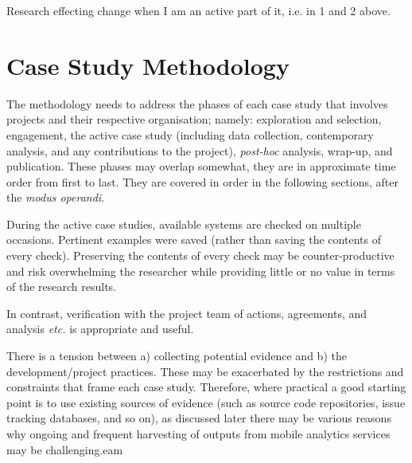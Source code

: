 Research effecting change when I am an active part of it, i.e. in 1 and 2 above.

\section{Case Study Methodology}
The methodology needs to address the phases of each case study that involves projects and their respective organisation; namely: exploration and selection, engagement, the active case study (including data collection, contemporary analysis, and any contributions to the project), \emph{post-hoc} analysis, wrap-up, and publication. These phases may overlap somewhat, they are in approximate time order from first to last. They are covered in order in the following sections, after the \emph{modus operandi}.

During the active case studies, available systems are checked on multiple occasions. Pertinent examples were saved (rather than saving the contents of every check). Preserving the contents of every check may be counter-productive and risk overwhelming the researcher while providing little or no value in terms of the research results. 

In contrast, verification with the project team of actions, agreements, and analysis \emph{etc.} is appropriate and useful.

There is a tension between a) collecting potential evidence and b) the development/project practices. These may be exacerbated by the restrictions and constraints that frame each case study. Therefore, where practical a good starting point is to use existing sources of evidence (such as source code repositories, issue tracking databases, and so on), as discussed later there may be various reasons why ongoing and frequent harvesting of outputs from mobile analytics services may be challenging.eam

